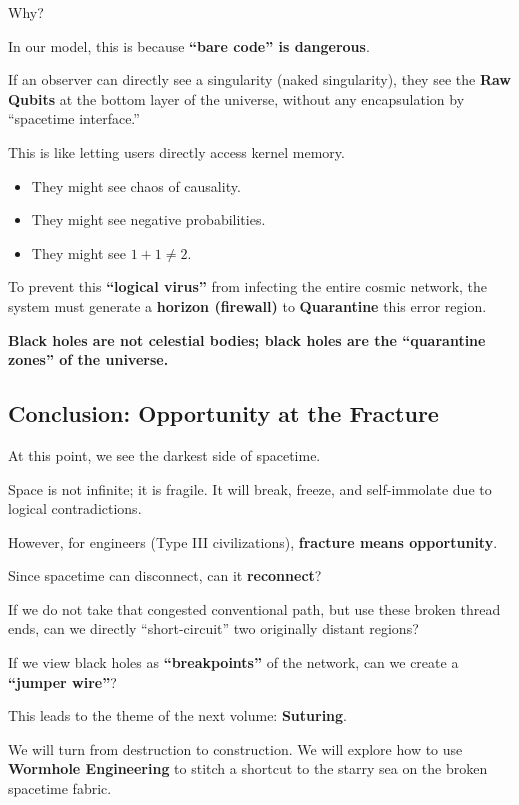 Why?

In our model, this is because \textbf{``bare code'' is dangerous}.

If an observer can directly see a singularity (naked singularity), they see the \textbf{Raw Qubits} at the bottom layer of the universe, without any encapsulation by ``spacetime interface.''

This is like letting users directly access kernel memory.

\begin{itemize}
\item They might see chaos of causality.

\item They might see negative probabilities.

\item They might see $1+1 \neq 2$.
\end{itemize}

To prevent this \textbf{``logical virus''} from infecting the entire cosmic network, the system must generate a \textbf{horizon (firewall)} to \textbf{Quarantine} this error region.

\textbf{Black holes are not celestial bodies; black holes are the ``quarantine zones'' of the universe.}

\subsection{Conclusion: Opportunity at the Fracture}

At this point, we see the darkest side of spacetime.

Space is not infinite; it is fragile. It will break, freeze, and self-immolate due to logical contradictions.

However, for engineers (Type III civilizations), \textbf{fracture means opportunity}.

Since spacetime can disconnect, can it \textbf{reconnect}?

If we do not take that congested conventional path, but use these broken thread ends, can we directly ``short-circuit'' two originally distant regions?

If we view black holes as \textbf{``breakpoints''} of the network, can we create a \textbf{``jumper wire''}?

This leads to the theme of the next volume: \textbf{Suturing}.

We will turn from destruction to construction. We will explore how to use \textbf{Wormhole Engineering} to stitch a shortcut to the starry sea on the broken spacetime fabric.

